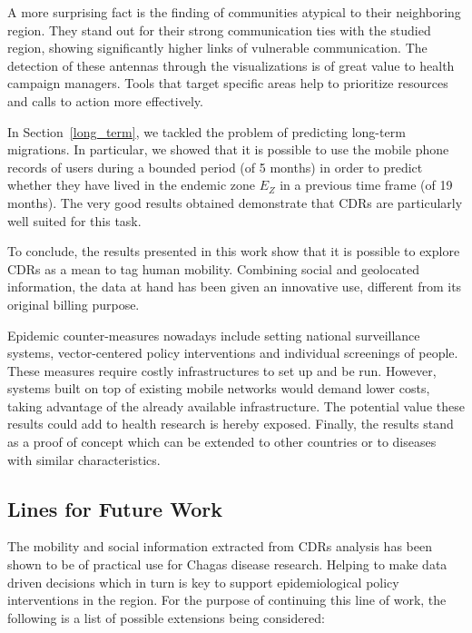 A more surprising fact is the finding of communities atypical to their neighboring region. They stand out for their strong communication ties with the studied region, showing significantly higher links of vulnerable communication. The detection of these antennas through the visualizations is of great value to health campaign managers. Tools that target specific areas help to prioritize resources and calls to action more effectively.

In Section~\ref{long_term}, we tackled the problem of predicting long-term migrations. In particular, we showed that it is possible to use the mobile phone records of users during a bounded period (of 5 months) in order to predict whether they have lived in the endemic zone $E_Z$ in a previous time frame (of 19 months).
The very good results obtained demonstrate that CDRs are particularly well suited for this task.
 
To conclude, the results presented in this work show that it is possible to explore CDRs as a mean to tag human mobility. Combining social and geolocated information, the data at hand has been given an innovative use, different from its original billing purpose.

Epidemic counter-measures nowadays include setting national surveillance systems, vector-centered policy interventions and individual screenings of people. These measures require costly infrastructures to set up and be run. However, systems built on top of existing mobile networks would demand lower costs, taking advantage of the already available infrastructure. The potential value these results could add to health research is hereby exposed.
Finally, the results stand as a proof of concept which can be extended to other countries or to diseases with similar characteristics.



\subsection{Lines for Future Work}

The mobility and social information extracted from CDRs analysis has been shown to be of practical use for Chagas disease research. Helping to make data driven decisions which in turn is key to support epidemiological policy interventions in the region. For the purpose of continuing this line of work, the following is a list of possible extensions being considered:

